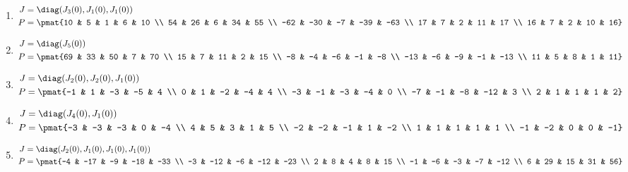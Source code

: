 \begin{enumerate}
\item

\begin{align*}
J &= \diag(J_{3}(0), J_{1}(0), J_{1}(0))\\
P &= \pmat{10 & 5 & 1 & 6 & 10 \\ 54 & 26 & 6 & 34 & 55 \\ -62 & -30 & -7 & -39 & -63 \\ 17 & 7 & 2 & 11 & 17 \\ 16 & 7 & 2 & 10 & 16}
\end{align*}

\item

\begin{align*}
J &= \diag(J_{5}(0))\\
P &= \pmat{69 & 33 & 50 & 7 & 70 \\ 15 & 7 & 11 & 2 & 15 \\ -8 & -4 & -6 & -1 & -8 \\ -13 & -6 & -9 & -1 & -13 \\ 11 & 5 & 8 & 1 & 11}
\end{align*}

\item

\begin{align*}
J &= \diag(J_{2}(0), J_{2}(0), J_{1}(0))\\
P &= \pmat{-1 & 1 & -3 & -5 & 4 \\ 0 & 1 & -2 & -4 & 4 \\ -3 & -1 & -3 & -4 & 0 \\ -7 & -1 & -8 & -12 & 3 \\ 2 & 1 & 1 & 1 & 2}
\end{align*}

\item

\begin{align*}
J &= \diag(J_{4}(0), J_{1}(0))\\
P &= \pmat{-3 & -3 & -3 & 0 & -4 \\ 4 & 5 & 3 & 1 & 5 \\ -2 & -2 & -1 & 1 & -2 \\ 1 & 1 & 1 & 1 & 1 \\ -1 & -2 & 0 & 0 & -1}
\end{align*}

\item

\begin{align*}
J &= \diag(J_{2}(0), J_{1}(0), J_{1}(0), J_{1}(0))\\
P &= \pmat{-4 & -17 & -9 & -18 & -33 \\ -3 & -12 & -6 & -12 & -23 \\ 2 & 8 & 4 & 8 & 15 \\ -1 & -6 & -3 & -7 & -12 \\ 6 & 29 & 15 & 31 & 56}
\end{align*}


\end{enumerate}
